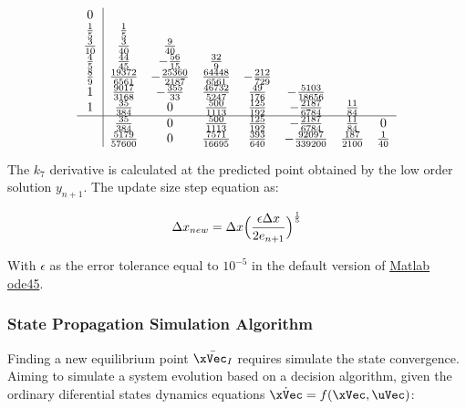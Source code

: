 \begin{equation}
    \begin{array}{c|ccccccc}
        0\\
        \frac{1}{5} & \frac{1}{5}\\
        \frac{3}{10} & \frac{3}{40} & \frac{9}{40} \\
        \frac{4}{5} & \frac{44}{45} & -\frac{56}{15} & \frac{32}{9}\\
        \frac{8}{9} & \frac{19372}{6561} & -\frac{25360}{2187} & \frac{64448}{6561} & -\frac{212}{729}\\
        1 & \frac{9017}{3168} & -\frac{355}{33} & \frac{46732}{5247} & \frac{49}{176} & -\frac{5103}{18656}\\
        1 & \frac{35}{384} & 0 & \frac{500}{1113} & \frac{125}{192} & -\frac{2187}{6784} & \frac{11}{84}\\
        \hline
        & \frac{35}{384} & 0 & \frac{500}{1113} & \frac{125}{192} & -\frac{2187}{6784} & \frac{11}{84} & 0  \\
        & \frac{5179}{57600} & 0 & \frac{7571}{16695} & \frac{393}{640} & -\frac{92097}{339200} & \frac{187}{2100} & \frac{1}{40}  
    \end{array}
    \label{eq:Dormand-Prince_Tableu}
\end{equation}

The \(k_7\) derivative is calculated at the predicted point obtained by the low order solution \(y_{n+1}\). The update size step equation as:

\begin{equation}
    \Delta x_{new} = \Delta x \Bigl( \frac{\epsilon\Delta x}{2e_{n+1}}\Bigr)^{\frac{1}{5}}
    \label{eq:Update_Size_Step_Equation}
\end{equation}

With \(\epsilon\) as the error tolerance equal to \(10^{-5}\) in the default version of \href{https://www.mathworks.com/help/matlab/ref/ode45.html}{Matlab ode45}.

\subsubsection{State Propagation Simulation Algorithm}
\label{subsub:State_Propagation_Simulation_Algorithm}

Finding a new equilibrium point \(\bar{\xVec_I}\) requires simulate the state convergence. Aiming to simulate a system evolution based on a decision algorithm, given the ordinary diferential states dynamics equations \(\dot{\xVec} = f(\xVec,\uVec)\):

